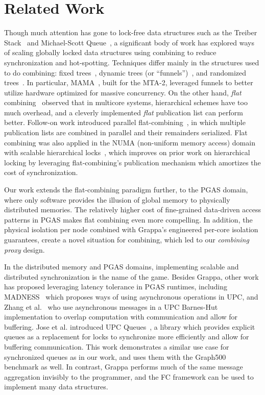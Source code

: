 \section{Related Work}
Though much attention has gone to lock-free data structures such as the Treiber Stack~\cite{treiber} and Michael-Scott Queue~\cite{msqueue}, a significant body of work has explored ways of scaling globally locked data structures using combining to reduce synchronization and hot-spotting.
Techniques differ mainly in the structures used to do combining: fixed trees~\cite{yew:combining-trees}, dynamic trees (or ``funnels'')~\cite{funnels,MAMA}, and randomized trees~\cite{edtrees}. In particular, MAMA~\cite{MAMA}, built for the MTA-2, leveraged funnels to better utilize hardware optimized for massive concurrency.
On the other hand, \emph{flat} combining~\cite{flatCombining} observed that in multicore systems, hierarchical schemes have too much overhead, and a cleverly implemented \emph{flat} publication list can perform better.
Follow-on work introduced parallel flat-combining~\cite{scalableFCQueues}, in which multiple publication lists are combined in parallel and their remainders serialized.
Flat combining was also applied in the NUMA (non-uniform memory access) domain with scalable hierarchical locks~\cite{fcNUMALocks}, which improves on prior work on hierarchical locking by leveraging flat-combining's publication mechanism which amortizes the cost of synchronization.

Our work extends the flat-combining paradigm further, to the PGAS domain, where only software provides the illusion of global memory to physically distributed memories. The relatively higher cost of fine-grained data-driven access patterns in PGAS makes flat combining even more compelling. In addition, the physical isolation per node combined with Grappa's engineered per-core isolation guarantees, create a novel situation for combining, which led to our \emph{combining proxy} design.

In the distributed memory and PGAS domains, implementing scalable and distributed synchronization is the name of the game.
Besides Grappa, other work has proposed leveraging latency tolerance in PGAS runtimes, including MADNESS~\cite{shet:async-upc} which proposes ways of using asynchronous operations in UPC, and Zhang et al.~\cite{zhang:barnes-hut} who use asynchronous messages in a UPC Barnes-Hut implementation to overlap computation with communication and allow for buffering.
Jose et al. introduced UPC Queues~\cite{jose:upc-queues}, a library which provides explicit queues as a replacement for locks to synchronize more efficiently and allow for buffering communication. This work demonstrates a similar use case for synchronized queues as in our work, and uses them with the Graph500 benchmark as well. In contrast, Grappa performs much of the same message aggregation invisibly to the programmer, and the FC framework can be used to implement many data structures.

